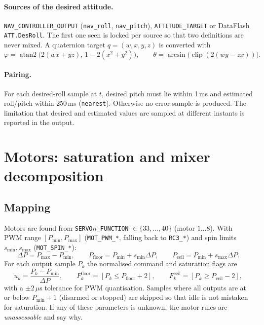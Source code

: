 \documentclass[11pt,a4paper]{article}
\newcommand{\code}[1]{\texttt{#1}}
\begin{document}
\paragraph{Sources of the desired attitude.} \code{NAV\_CONTROLLER\_OUTPUT}
(\code{nav\_roll}, \code{nav\_pitch}), \code{ATTITUDE\_TARGET} or DataFlash \code{ATT.DesRoll}. The
first one seen is locked per source so that two definitions are never mixed. A quaternion target
$q=(w,x,y,z)$ is converted with
\[
\varphi=\operatorname{atan2}\!\bigl(2(wx+yz),\,1-2(x^2+y^2)\bigr),\qquad
\theta=\arcsin\!\bigl(\operatorname{clip}(2(wy-zx))\bigr).
\]

\paragraph{Pairing.} For each desired-roll sample at $t$, desired pitch must lie within 1\,ms and
estimated roll/pitch within 250\,ms (\code{nearest}). Otherwise no error sample is produced. The
limitation that desired and estimated values are sampled at different instants is reported in the
output.

\section{Motors: saturation and mixer decomposition}\label{sec:motors}

\subsection{Mapping}
Motors are found from \code{SERVO$n$\_FUNCTION} $\in\{33,\dots,40\}$ (motor $1\dots8$). With PWM
range $[P_{\min},P_{\max}]$ (\code{MOT\_PWM\_*}, falling back to \code{RC3\_*}) and spin limits
$s_{\min},s_{\max}$ (\code{MOT\_SPIN\_*}):
\[
\Delta P=P_{\max}-P_{\min},\qquad
P_{\text{floor}}=P_{\min}+s_{\min}\Delta P,\qquad
P_{\text{ceil}}=P_{\min}+s_{\max}\Delta P .
\]
For each output sample $P_k$ the normalised command and saturation flags are
\[
u_k=\frac{P_k-P_{\min}}{\Delta P},\qquad
F^{\text{floor}}_k=[P_k\le P_{\text{floor}}+2],\qquad
F^{\text{ceil}}_k=[P_k\ge P_{\text{ceil}}-2],
\]
with a $\pm2\,\mu$s tolerance for PWM quantisation. Samples where all outputs are at or below
$P_{\min}+1$ (disarmed or stopped) are skipped so that idle is not mistaken for saturation. If any
of these parameters is unknown, the motor rules are \emph{unassessable} and say why.
\end{document}
